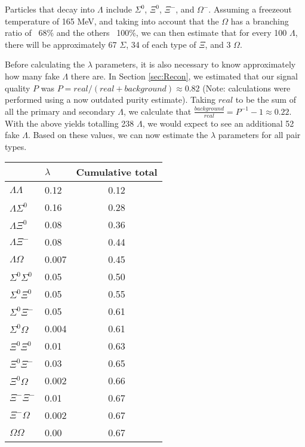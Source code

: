 Particles that decay into $\Lambda$ include $\Sigma^0$, $\Xi^0$, $\Xi^-$, and $\Omega^-$.  
Assuming a freezeout temperature of 165 MeV, and taking into account that the $\Omega$ has a branching ratio of ~68\% and the others ~100\%, we can then estimate that for every 100 $\Lambda$, there will be approximately 67 $\Sigma$, 34 of each type of $\Xi$, and 3 $\Omega$.

Before calculating the $\lambda$ parameters, it is also necessary to know approximately how many fake $\Lambda$ there are.  
In Section \ref{sec:Recon}, we estimated that our signal quality $P$ was $P = real/(real + background) \approx 0.82$ (Note: calculations were performed using a now outdated purity estimate).  
Taking $real$ to be the sum of all the primary and secondary $\Lambda$, we calculate that $\frac{background}{real} = P^{-1}-1 \approx 0.22$.  
With the above yields totalling 238 $\Lambda$, we would expect to see an additional 52 fake $\Lambda$.  
Based on these values, we can now estimate the $\lambda$ parameters for all pair types.

\begin{center}
\begin{tabular}{|l|l|c|}
\hline
					& 	$\lambda$	&	Cumulative total \\ \hline
$\Lambda\Lambda$   	&	0.12			&	0.12 \\ \hline
$\Lambda\Sigma^0$  	&	0.16			&	0.28 \\ \hline
$\Lambda\Xi^0$     	&	0.08			&	0.36 \\ \hline
$\Lambda\Xi^-$     	&	0.08			&	0.44 \\ \hline
$\Lambda\Omega$    	&	0.007		&	0.45 \\ \hline
$\Sigma^0\Sigma^0$ 	&	0.05			&	0.50 \\ \hline
$\Sigma^0\Xi^0$    	&	0.05			&	0.55 \\ \hline
$\Sigma^0\Xi^-$    	&	0.05			&	0.61 \\ \hline
$\Sigma^0\Omega$   	&	0.004		&	0.61 \\ \hline
$\Xi^0\Xi^0$       	&	0.01			&	0.63 \\ \hline
$\Xi^0\Xi^-$ 		&	0.03			&	0.65 \\ \hline
$\Xi^0\Omega$ 		&	0.002		&	0.66 \\ \hline
$\Xi^-\Xi^-$ 		&	0.01			&	0.67 \\ \hline
$\Xi^-\Omega$ 		&	0.002		&	0.67 \\ \hline
$\Omega\Omega$ 		&	0.00			&	0.67 \\ \hline
\end{tabular}
\end{center}

